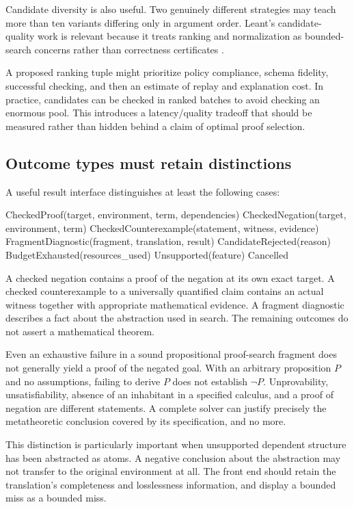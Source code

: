 \documentclass[11pt,a4paper]{article}
\theoremstyle{remark}
\begin{document}
Candidate diversity is also useful. Two genuinely different strategies may teach more than ten variants differing only in argument order. Leant's candidate-quality work is relevant because it treats ranking and normalization as bounded-search concerns rather than correctness certificates \cite{leant-quality}.

A proposed ranking tuple might prioritize policy compliance, schema fidelity, successful checking, and then an estimate of replay and explanation cost. In practice, candidates can be checked in ranked batches to avoid checking an enormous pool. This introduces a latency/quality tradeoff that should be measured rather than hidden behind a claim of optimal proof selection.

\subsection{Outcome types must retain distinctions}\label{sec:outcomes}

A useful result interface distinguishes at least the following cases:
\begin{Code}
CheckedProof(target, environment, term, dependencies)
CheckedNegation(target, environment, term)
CheckedCounterexample(statement, witness, evidence)
FragmentDiagnostic(fragment, translation, result)
CandidateRejected(reason)
BudgetExhausted(resources_used)
Unsupported(feature)
Cancelled
\end{Code}
A checked negation contains a proof of the negation at its own exact target. A checked counterexample to a universally quantified claim contains an actual witness together with appropriate mathematical evidence. A fragment diagnostic describes a fact about the abstraction used in search. The remaining outcomes do not assert a mathematical theorem.

Even an exhaustive failure in a sound propositional proof-search fragment does not generally yield a proof of the negated goal. With an arbitrary proposition \(P\) and no assumptions, failing to derive \(P\) does not establish \(\neg P\). Unprovability, unsatisfiability, absence of an inhabitant in a specified calculus, and a proof of negation are different statements. A complete solver can justify precisely the metatheoretic conclusion covered by its specification, and no more.

This distinction is particularly important when unsupported dependent structure has been abstracted as atoms. A negative conclusion about the abstraction may not transfer to the original environment at all. The front end should retain the translation's completeness and losslessness information, and display a bounded miss as a bounded miss.
\end{document}
